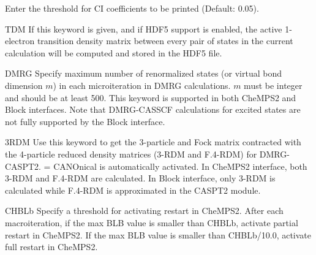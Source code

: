 \begin{keywordlist}
Enter the threshold for CI coefficients to be printed (Default: 0.05).
\item[TDM]
If this keyword is given, and if HDF5 support is enabled, the active 1-electron transition
density matrix between every pair of states in the current calculation will be computed and
stored in the HDF5 file.
\item[DMRG]
Specify maximum number of renormalized states (or virtual bond dimension $m$) 
in each microiteration in DMRG calculations.
$m$ must be integer and should be at least 500.
This keyword is supported in both CheMPS2 and Block interfaces.
Note that DMRG-CASSCF calculations for excited states are not fully supported by the Block interface.
\item[3RDM]
Use this keyword to get the 3-particle and Fock matrix contracted with the 4-particle reduced density 
matrices (3-RDM and F.4-RDM) for DMRG-CASPT2. 
 = CANOnical is automatically activated.
In CheMPS2 interface, both 3-RDM and F.4-RDM are calculated.
In Block interface, only 3-RDM is calculated while F.4-RDM is approximated in the CASPT2 module.
\item[CHBLb]
Specify a threshold for activating restart in CheMPS2. 
After each macroiteration, if the max BLB value is smaller than CHBLb, activate partial restart in CheMPS2. 
If the max BLB value is smaller than CHBLb/10.0, activate full restart in CheMPS2. 

\end{keywordlist}
